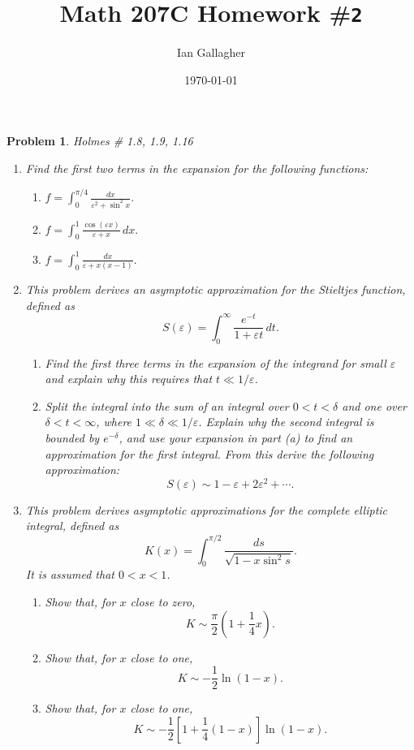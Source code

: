 \documentclass[11pt]{article}
\title{Math 207C Homework \#\texttt{2}}
\author{Ian Gallagher}
\date{\today}
\theoremstyle{problemstyle}
\newtheorem{problem}{Problem}
\begin{document}
\maketitle

\begin{problem}
  Holmes \# 1.8, 1.9, 1.16
  \begin{enumerate}
    \item[(1.8)] Find the first two terms in the expansion for the following
      functions:
      \begin{enumerate}
          \item \( f = \displaystyle\int_0^{\pi/4}
            \frac{dx}{\varepsilon^2 + \sin^2 x}. \)
          \item \( f = \displaystyle\int_0^1 \frac{\cos(\varepsilon
            x)}{\varepsilon + x} \, dx. \)
          \item \( f = \displaystyle\int_0^1 \frac{dx}{\varepsilon +
            x(x - 1)}. \)
      \end{enumerate}
    \item[(1.9)] This problem derives an asymptotic approximation for the
      Stieltjes function, defined as
      \[
        S(\varepsilon) = \int_0^\infty \frac{e^{-t}}{1 + \varepsilon t} \,
        dt.
      \]
      \begin{enumerate}
        \item Find the first three terms in the expansion of the
          integrand for small $\varepsilon$ and explain why this requires
          that $t \ll 1/\varepsilon$.
        \item Split the integral into the sum of an integral over $0
          < t < \delta$ and one over $\delta < t < \infty$, where $1 \ll
          \delta \ll 1/\varepsilon$. Explain why the second integral is
          bounded by $e^{-\delta}$, and use your expansion in part (a) to
          find an approximation for the first integral. From this derive
          the following approximation:
          \[
            S(\varepsilon) \sim 1 - \varepsilon + 2 \varepsilon^2 + \cdots.
          \]
      \end{enumerate}
    \item[(1.16)] This problem derives asymptotic approximations for the
      complete elliptic integral, defined as
      \[
        K(x) = \int_0^{\pi/2} \frac{ds}{\sqrt{1 - x \sin^2 s}}.
      \]
      It is assumed that $0 < x < 1$.
      \begin{enumerate}
          \item Show that, for $x$ close to zero, 
            \[
              K \sim \frac{\pi}{2} \left(1 + \frac{1}{4}x\right).
            \]
          \item Show that, for $x$ close to one, 
            \[
              K \sim -\frac{1}{2} \ln(1 - x).
            \]
          \item Show that, for $x$ close to one,
            \[
              K \sim -\frac{1}{2} \left[ 1 + \frac{1}{4}(1 - x) \right]
              \ln(1 - x).
            \]
      \end{enumerate}
  \end{enumerate}
\end{problem}
\end{document}
